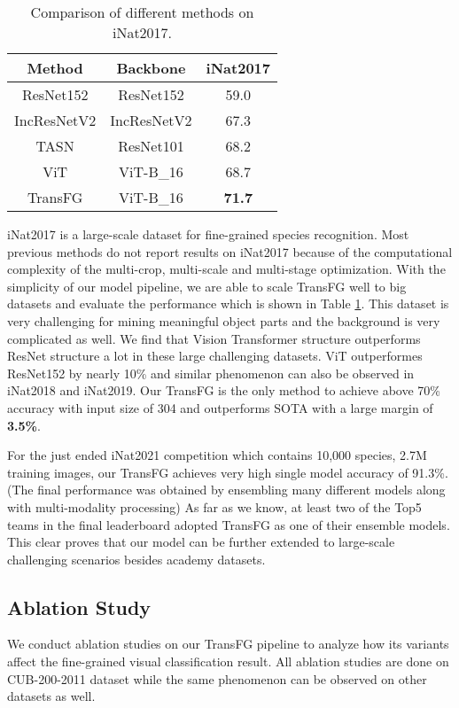 \begin{table}[]
    \small
    \centering
    \caption{Comparison of different methods on iNat2017.}
    \label{tab:inat}
    \begin{tabular}{c|c|c}
    \hline
    Method & Backbone & iNat2017 \\ \hline
    ResNet152 & ResNet152 & 59.0 \\
    IncResNetV2 & IncResNetV2 & 67.3 \\ 
    TASN & ResNet101 & 68.2 \\ \hline
    ViT & ViT-B\_16 & 68.7 \\ 
    TransFG & ViT-B\_16 & \textbf{71.7} \\ \hline
    \end{tabular}
\end{table}

iNat2017 is a large-scale dataset for fine-grained species recognition. Most previous methods do not report results on iNat2017 because of the computational complexity of the multi-crop, multi-scale and multi-stage optimization. With the simplicity of our model pipeline, we are able to scale TransFG well to big datasets and evaluate the performance which is shown in Table \ref{tab:inat}. This dataset is very challenging for mining meaningful object parts and the background is very complicated as well. We find that Vision Transformer structure outperforms ResNet structure a lot in these large challenging datasets. ViT outperformes ResNet152 by nearly 10\% and similar phenomenon can also be observed in iNat2018 and iNat2019. Our TransFG is the only method to achieve above 70\% accuracy with input size of 304 and outperforms SOTA with a large margin of \textbf{3.5\%}.

For the just ended iNat2021 competition which contains 10,000 species, 2.7M training images, our TransFG achieves very high single model accuracy of 91.3\%. (The final performance was obtained by ensembling many different models along with multi-modality processing) As far as we know, at least two of the Top5 teams in the final leaderboard adopted TransFG as one of their ensemble models. This clear proves that our model can be further extended to large-scale challenging scenarios besides academy datasets.

\subsection{Ablation Study}
\label{sec:ablation}

We conduct ablation studies on our TransFG pipeline to analyze how its variants affect the fine-grained visual classification result. All ablation studies are done on CUB-200-2011 dataset while the same phenomenon can be observed on other datasets as well.

